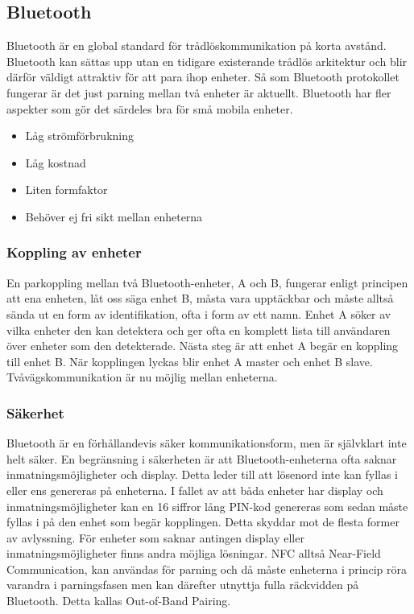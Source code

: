 \documentclass[a4paper,12pt,fleqn]{article}
\begin{document}
\subsection{Bluetooth}
Bluetooth är en global standard för trådlöskommunikation på korta avstånd. Bluetooth kan sättas upp utan en tidigare existerande trådlös arkitektur och blir därför väldigt attraktiv för att para ihop enheter. Så som Bluetooth protokollet fungerar är det just parning mellan två enheter är aktuellt. Bluetooth har fler aspekter som gör det särdeles bra för små mobila enheter. 
\begin{itemize}
\item Låg strömförbrukning 
\item Låg kostnad
\item Liten formfaktor
\item Behöver ej fri sikt mellan enheterna
\end{itemize}

\subsubsection{Koppling av enheter}
En parkoppling mellan två Bluetooth-enheter, A och B, fungerar enligt principen att ena enheten, låt oss säga enhet B, måsta vara upptäckbar och måste alltså sända ut en form av identifikation, ofta i form av ett namn. Enhet A söker av vilka enheter den kan detektera och ger ofta en komplett lista till användaren över enheter som den detekterade. Nästa steg är att enhet A begär en koppling till enhet B. När kopplingen lyckas blir enhet A master och enhet B slave. Tvåvägskommunikation är nu möjlig mellan enheterna.

\subsubsection{Säkerhet}
Bluetooth är en förhållandevis säker kommunikationsform, men är självklart inte helt säker. En begränsning i säkerheten är att Bluetooth-enheterna ofta saknar inmatningsmöjligheter och display. Detta leder till att lösenord inte kan fyllas i eller ens genereras på enheterna. I fallet av att båda enheter har display och inmatningsmöjligheter kan en 16 siffror lång PIN-kod genereras som sedan måste fyllas i på den enhet som begär kopplingen. Detta skyddar mot de flesta former av avlyssning.
För enheter som saknar antingen display eller inmatningsmöjligheter finns andra möjliga lösningar. NFC alltså Near-Field Communication, kan användas för parning och då måste enheterna i princip röra varandra i parningsfasen men kan därefter utnyttja fulla räckvidden på Bluetooth. Detta kallas Out-of-Band Pairing.
\end{document}

